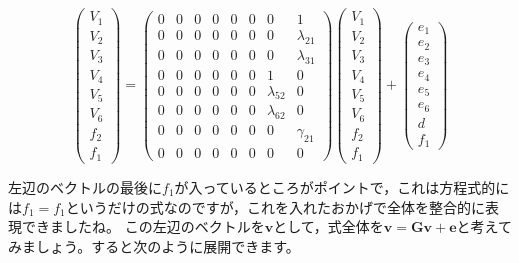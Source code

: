 \documentclass{ltjsbook}
\begin{document}
\[
	\begin{pmatrix} V_1 \\ V_2 \\ V_3 \\ V_4 \\ V_5 \\ V_6 \\ f_2 \\f_1 \end{pmatrix} =
	\begin{pmatrix} 0 & 0 & 0 & 0 & 0 & 0 & 0            & 1            \\
                0 & 0 & 0 & 0 & 0 & 0 & 0            & \lambda_{21} \\
                0 & 0 & 0 & 0 & 0 & 0 & 0            & \lambda_{31} \\
                0 & 0 & 0 & 0 & 0 & 0 & 1            & 0            \\
                0 & 0 & 0 & 0 & 0 & 0 & \lambda_{52} & 0            \\
                0 & 0 & 0 & 0 & 0 & 0 & \lambda_{62} & 0            \\
                0 & 0 & 0 & 0 & 0 & 0 & 0            & \gamma_{21}  \\
                0 & 0 & 0 & 0 & 0 & 0 & 0            & 0\end{pmatrix}
	\begin{pmatrix} V_1 \\ V_2 \\ V_3 \\ V_4 \\ V_5 \\ V_6 \\ f_2 \\f_1 \end{pmatrix} +
	\begin{pmatrix} e_1 \\ e_2 \\ e_3 \\ e_4 \\ e_5 \\ e_6 \\ d \\f_1 \end{pmatrix}
\]

左辺のベクトルの最後に$f_1$が入っているところがポイントで，これは方程式的には$f_1=f_1$というだけの式なのですが，これを入れたおかげで全体を整合的に表現できましたね。
この左辺のベクトルを$\bm{v}$として，式全体を$\bm{v} = \bm{Gv}+\bm{e}$と考えてみましょう。すると次のように展開できます。
\end{document}
